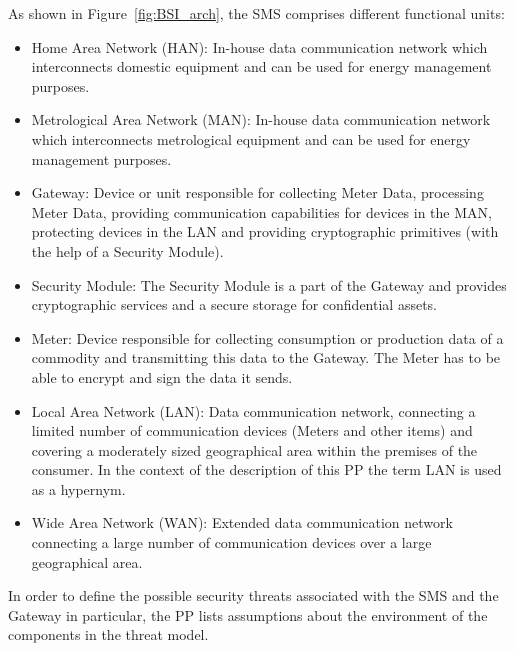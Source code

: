 As shown in Figure~\ref{fig:BSI_arch}, the SMS comprises different functional units:
\begin{itemize}
\item Home Area Network (HAN): In-house data communication network which interconnects domestic equipment and can be used for energy management purposes.
\item Metrological Area Network (MAN): In-house data communication network which interconnects metrological equipment and can be used for energy management purposes.
\item Gateway: Device or unit responsible for collecting Meter Data, processing Meter Data,  providing communication capabilities for devices in the MAN, protecting devices in the LAN and providing cryptographic primitives (with the help of a Security Module).
\item  Security Module: The Security Module is a part of the Gateway and provides cryptographic services and a secure storage for confidential assets.
\item Meter: Device responsible for collecting consumption or production data of a commodity and transmitting this data to the Gateway. The Meter has to be able to encrypt and sign the data it sends.
\item Local Area Network (LAN): Data communication network, connecting a limited number of communication devices (Meters and other items) and covering a moderately sized geographical area within the premises of the consumer. In the context of the description of this PP the term LAN is used as a hypernym.
\item Wide Area Network (WAN): Extended data communication network connecting a large number of communication devices over a large geographical area.
\end{itemize}

In order to define the possible security threats associated with the SMS and the Gateway in particular, the PP lists assumptions about the environment  of the components in the threat model.


